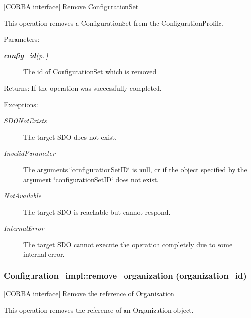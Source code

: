 [CORBA interface] Remove Configuration\-Set 

This operation removes a Configuration\-Set from the Configuration\-Profile.

\begin{Desc}
\item[Parameters:]
\begin{description}
\item[{\em {\bf config\_\-id}{\rm (p.\,\pageref{classConfiguration__impl_1_1config__id})}}]The id of Configuration\-Set which is removed. \end{description}
\end{Desc}
\begin{Desc}
\item[Returns:]If the operation was successfully completed. \end{Desc}
\begin{Desc}
\item[Exceptions:]
\begin{description}
\item[{\em SDONot\-Exists}]The target SDO does not exist. \item[{\em Invalid\-Parameter}]The arguments \char`\"{}configuration\-Set\-ID\char`\"{} is null, or if the object specified by the argument \char`\"{}configuration\-Set\-ID\char`\"{} does not exist. \item[{\em Not\-Available}]The target SDO is reachable but cannot respond. \item[{\em Internal\-Error}]The target SDO cannot execute the operation completely due to some internal error.\end{description}
\end{Desc}
\subsubsection{\setlength{\rightskip}{0pt plus 5cm}Configuration\_\-impl::remove\_\-organization (organization\_\-id)}\label{classConfiguration__impl_Configuration__impla5}


[CORBA interface] Remove the reference of Organization 

This operation removes the reference of an Organization object.

